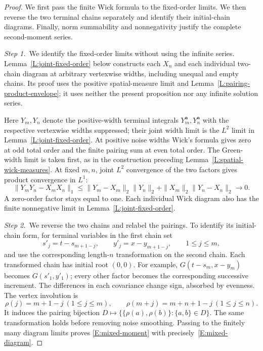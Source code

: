 \documentclass[12pt,oneside,openany]{book}
\numberwithin{equation}{section}
\theoremstyle{nogostyle}
\theoremstyle{definition}
\begin{document}
\begin{proof}
  We first pass the finite Wick formula to the fixed-order limits. We then
  reverse the two terminal chains separately and identify their initial-chain
  diagrams. Finally, norm summability and nonnegativity justify the complete
  second-moment series.


  \medskip
  \noindent\textit{Step 1.~}We identify the fixed-order limits without using
  the infinite series.
  Lemma~\ref{L:joint-fixed-order} below constructs each $X_n$ and each
  individual two-chain diagram at arbitrary vertexwise widths, including unequal
  and empty chains. Its proof uses the positive spatial-measure limit and
  Lemma~\ref{L:pairing-product-envelope}; it uses neither the present
  proposition nor any infinite solution series.

  Here $Y_m,Y_n$ denote the positive-width terminal integrals
  $Y_m^{\boldsymbol a},Y_n^{\boldsymbol a}$ with the respective vertexwise
  widths suppressed; their joint width limit is the $L^2$ limit in
  Lemma~\ref{L:joint-fixed-order}.
  At positive noise widths Wick's formula gives zero at odd total order and the
  finite pairing sum at even total order. The Green-width limit is taken first,
  as in the construction preceding Lemma~\ref{L:spatial-wick-measures}. At fixed
  $m,n$, joint $L^2$ convergence of the two factors gives product convergence in
  $L^1$:
  \[
    \|Y_mY_n-X_mX_n\|_1
    \le\|Y_m-X_m\|_2\|Y_n\|_2
    +\|X_m\|_2\|Y_n-X_n\|_2\longrightarrow0.
  \]
  A zero-order factor stays equal to one. Each individual Wick diagram also has
  the finite nonnegative limit in Lemma~\ref{L:joint-fixed-order}.


  \medskip
  \noindent\textit{Step 2.~}We reverse the two chains and relabel the
  pairings.
  To identify its initial-chain form, for terminal variables in the first chain
  set
  \[
    s'_j=t-s_{m+1-j},\qquad y'_j=x-y_{m+1-j},\qquad1\le j\le m,
  \]
  and use the corresponding length-$n$ transformation on the second chain. Each
  transformed chain has initial root $(0,0)$. For example, $G(t-s_m,x-y_m)$
  becomes $G(s'_1,y'_1)$; every other factor becomes the corresponding
  successive increment. The differences in each covariance change sign, absorbed
  by evenness. The vertex involution is
  \[
    \rho(j)=m+1-j\ (1\le j\le m),\qquad
    \rho(m+j)=m+n+1-j\ (1\le j\le n).
  \]
  It induces the pairing bijection $D\mapsto\{\{\rho(a),\rho(b)\}:\{a,b\}\in
  D\}$. The same transformation holds before removing noise smoothing. Passing
  to the finitely many diagram limits proves \eqref{E:mixed-moment} with
  precisely~\eqref{E:mixed-diagram}.



\end{proof}
\end{document}
